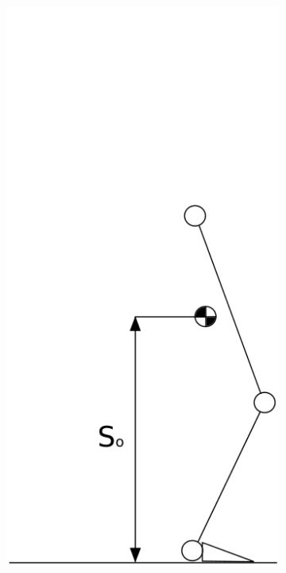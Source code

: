 \begin{figure}[ht!]
    \centering
    \begin{subfigure}[b]{0.3\textwidth}
        \includegraphics[width=\textwidth]{figures/launch_phase.png}

\end{subfigure}
\end{figure}
